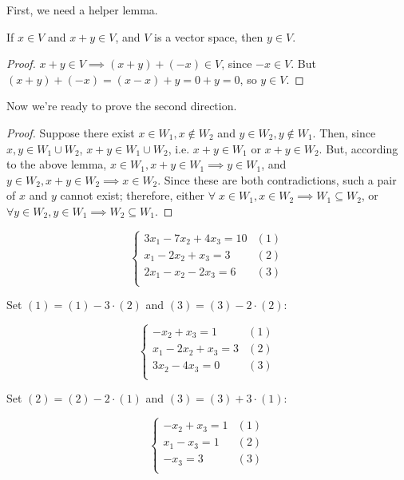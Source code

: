 First, we need a helper lemma.

\begin{lemma}
    If $x \in V$ and $x + y \in V$, and $V$ is a vector space, then $y \in V$.
\end{lemma}

\begin{proof}
    $x + y \in V \implies (x + y) + (-x) \in V$, since $-x \in V$. But $(x + y) + (-x) = (x - x) + y = 0 + y = 0$, so $y \in V$.
\end{proof}

Now we're ready to prove the second direction.
\begin{proof}
    Suppose there exist $x \in W_1, x \notin W_2$ and $y \in W_2, y \notin W_1$. Then, since $x, y \in W_1 \cup W_2$, $x + y \in W_1 \cup W_2$, i.e. $x + y \in W_1$ or $x + y \in W_2$. But, according to the above lemma, $x \in W_1, x + y \in W_1 \implies y \in W_1$, and $y \in W_2, x + y \in W_2 \implies x \in W_2$. Since these are both contradictions, such a pair of $x$ and $y$ cannot exist; therefore, either $\forall\; x \in W_1, x \in W_2 \implies W_1 \subseteq W_2$, or $\forall y \in W_2, y \in W_1 \implies W_2 \subseteq W_1$. 
\end{proof}



$$
\begin{cases}
    3x_1 - 7x_2 + 4x_3 = 10 & (1) \\
    x_1 - 2x_2 + x_3 = 3 & (2) \\
    2x_1 - x_2 - 2x_3 = 6 & (3) \\
\end{cases}
$$

Set $(1) = (1) - 3 \cdot (2)$ and $(3) = (3) - 2 \cdot (2)$:

$$
\begin{cases}
    -x_2 + x_3 = 1 & (1) \\
    x_1 - 2x_2 + x_3 = 3 & (2) \\
    3x_2 - 4x_3 = 0 & (3) \\
\end{cases}
$$

Set $(2) = (2) - 2 \cdot (1)$ and $(3) = (3) + 3 \cdot (1)$:

$$
\begin{cases}
    -x_2 + x_3 = 1 & (1) \\
    x_1 - x_3 = 1 & (2) \\
    -x_3 = 3 & (3) \\
\end{cases}
$$

